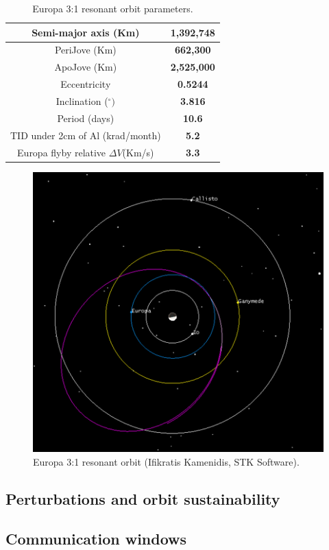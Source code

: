 \begin{table}[htb]
  \centering
    \begin{tabular}{|c|c|}
    \hline
    Semi-major axis (Km) & \textbf{1,392,748} \bigstrut\\
    \hline
    PeriJove (Km) & \textbf{662,300} \bigstrut\\
    \hline
    ApoJove (Km) & \textbf{2,525,000} \bigstrut\\
    \hline
    Eccentricity & \textbf{0.5244} \bigstrut\\
    \hline
    Inclination ($^\circ)$ & \textbf{3.816} \bigstrut\\
    \hline
    Period (days) & \textbf{10.6} \bigstrut\\
    \hline
    TID under 2cm of Al (krad/month) & \textbf{5.2} \bigstrut\\
    \hline
    Europa flyby relative $\Delta V$(Km/s) & \textbf{3.3} \bigstrut\\
    \hline
    \end{tabular}%
    \caption{Europa 3:1 resonant orbit parameters.}
  \label{tab:eurorb}%
\end{table}%
\begin{figure}[htb]
\centering
\includegraphics[scale=1]{figures/Orbiter/europares.png}
\caption{Europa 3:1 resonant orbit (Ifikratis Kamenidis, STK Software).}
\end{figure}
\subsection{Perturbations and orbit sustainability}
\subsection{Communication windows}
